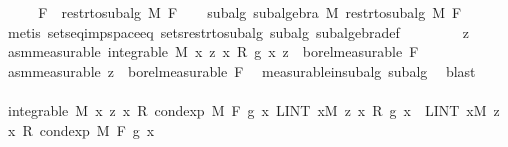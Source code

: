 \begin{isabellebody}
%
\isadelimproof
%
\endisadelimproof
%
\isatagproof
{}\isamarkupfalse%
\ {\isacharminus}{\kern0pt}\isanewline
\ \ \isamarkupfalse%
\ {\isacharquery}{\kern0pt}F\ {\isacharequal}{\kern0pt}\ {\isachardoublequoteopen}restr{\isacharunderscore}{\kern0pt}to{\isacharunderscore}{\kern0pt}subalg\ M\ F{\isachardoublequoteclose}\isanewline
\ \ \isamarkupfalse%
\ subalg{\isacharprime}{\kern0pt}{\isacharcolon}{\kern0pt}\ {\isachardoublequoteopen}subalgebra\ M\ {\isacharparenleft}{\kern0pt}restr{\isacharunderscore}{\kern0pt}to{\isacharunderscore}{\kern0pt}subalg\ M\ F{\isacharparenright}{\kern0pt}{\isachardoublequoteclose}\ \isamarkupfalse%
\ {\isacharparenleft}{\kern0pt}metis\ sets{\isacharunderscore}{\kern0pt}eq{\isacharunderscore}{\kern0pt}imp{\isacharunderscore}{\kern0pt}space{\isacharunderscore}{\kern0pt}eq\ sets{\isacharunderscore}{\kern0pt}restr{\isacharunderscore}{\kern0pt}to{\isacharunderscore}{\kern0pt}subalg\ subalg\ subalgebra{\isacharunderscore}{\kern0pt}def{\isacharparenright}{\kern0pt}\isanewline
\ \ \isacommand{{\isacharbraceleft}{\kern0pt}}\isamarkupfalse%
\isanewline
\ \ \ \ \isamarkupfalse%
\ z\ \isamarkupfalse%
\ asm{\isacharbrackleft}{\kern0pt}measurable{\isacharbrackright}{\kern0pt}{\isacharcolon}{\kern0pt}\ {\isachardoublequoteopen}integrable\ M\ {\isacharparenleft}{\kern0pt}{\isasymlambda}x{\isachardot}{\kern0pt}\ z\ x\ {\isacharasterisk}{\kern0pt}\isactrlsub R\ g\ x{\isacharparenright}{\kern0pt}{\isachardoublequoteclose}\ {\isachardoublequoteopen}z\ {\isasymin}\ borel{\isacharunderscore}{\kern0pt}measurable\ {\isacharquery}{\kern0pt}F{\isachardoublequoteclose}\isanewline
\ \ \ \ \isamarkupfalse%
\ asm{\isacharprime}{\kern0pt}{\isacharbrackleft}{\kern0pt}measurable{\isacharbrackright}{\kern0pt}{\isacharcolon}{\kern0pt}\ {\isachardoublequoteopen}z\ {\isasymin}\ borel{\isacharunderscore}{\kern0pt}measurable\ F{\isachardoublequoteclose}\ \isamarkupfalse%
\ measurable{\isacharunderscore}{\kern0pt}in{\isacharunderscore}{\kern0pt}subalg{\isacharprime}{\kern0pt}\ subalg\ \isamarkupfalse%
\ blast\isanewline
\ \ \ \ \isamarkupfalse%
\ {\isachardoublequoteopen}integrable\ M\ {\isacharparenleft}{\kern0pt}{\isasymlambda}x{\isachardot}{\kern0pt}\ z\ x\ {\isacharasterisk}{\kern0pt}\isactrlsub R\ cond{\isacharunderscore}{\kern0pt}exp\ M\ F\ g\ x{\isacharparenright}{\kern0pt}{\isachardoublequoteclose}\ {\isachardoublequoteopen}LINT\ x{\isacharbar}{\kern0pt}M{\isachardot}{\kern0pt}\ z\ x\ {\isacharasterisk}{\kern0pt}\isactrlsub R\ g\ x\ {\isacharequal}{\kern0pt}\ LINT\ x{\isacharbar}{\kern0pt}M{\isachardot}{\kern0pt}\ z\ x\ {\isacharasterisk}{\kern0pt}\isactrlsub R\ cond{\isacharunderscore}{\kern0pt}exp\ M\ F\ g\ x{\isachardoublequoteclose}\isanewline

\end{isabellebody}
